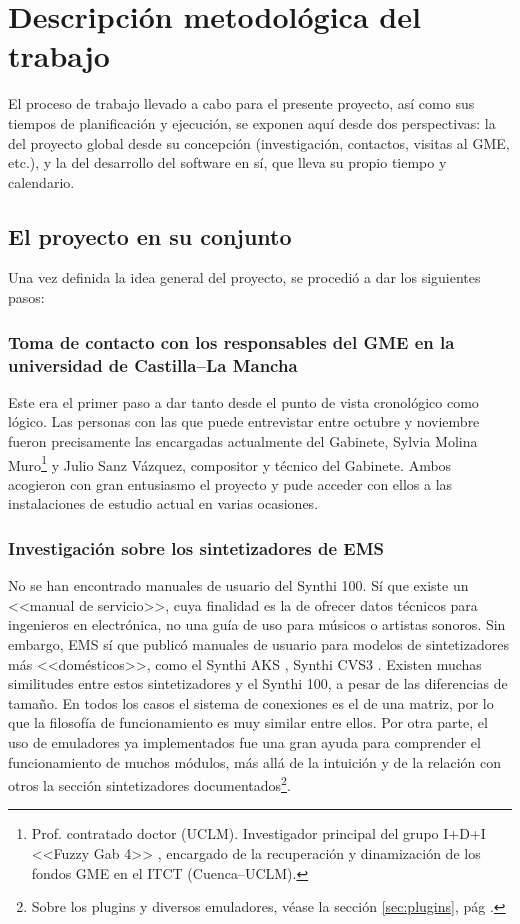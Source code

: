 \chapter[Metodología]{Descripción metodológica del trabajo}

El proceso de trabajo llevado a cabo para el presente proyecto, así como sus tiempos de planificación y ejecución, se exponen aquí desde dos perspectivas: la del proyecto global desde su concepción (investigación, contactos, visitas al GME, etc.), y la del desarrollo del software en sí, que lleva su propio tiempo y calendario. 

\section[El proyecto en su conjunto]{El proyecto en su conjunto }


Una vez definida la idea general del proyecto, se procedió a dar los siguientes pasos:

\subsection{Toma de contacto con los responsables del GME en la universidad de Castilla--La Mancha }

Este era el primer paso a dar tanto desde el punto de vista cronológico como lógico. Las personas con las que puede entrevistar entre octubre y noviembre fueron precisamente las encargadas actualmente del Gabinete, Sylvia Molina Muro\footnote{Prof. contratado doctor (UCLM). Investigador principal del grupo I+D+I <<Fuzzy Gab 4>> \citeyear{fuzzy}, encargado de la recuperación y dinamización de los fondos GME en el ITCT (Cuenca--UCLM).} y Julio Sanz Vázquez, compositor y técnico del Gabinete. Ambos acogieron con gran entusiasmo el proyecto y pude acceder con ellos a las instalaciones de estudio actual en varias ocasiones.

\subsection{Investigación sobre los sintetizadores de EMS}

No se han encontrado manuales de usuario del Synthi 100. Sí que existe un <<manual de servicio>>, cuya finalidad es la de ofrecer datos técnicos para ingenieros en electrónica, no una guía de uso para músicos o artistas sonoros. Sin embargo, EMS sí que publicó manuales de usuario para modelos de sintetizadores más <<domésticos>>, como el Synthi AKS \citeyear{SynthiAKS_brochure}, Synthi CVS3 \citeyear{SynthiVCS3_brochure}. Existen muchas similitudes entre estos sintetizadores y el Synthi 100, a pesar de las diferencias de tamaño. En todos los casos el sistema de conexiones es el de una matriz, por lo que la filosofía de funcionamiento es muy similar entre ellos. Por otra parte, el uso de emuladores ya implementados fue una gran ayuda para comprender el funcionamiento de muchos módulos, más allá de la intuición y de la relación con otros la sección sintetizadores documentados\footnote{Sobre los plugins y diversos emuladores, véase la sección \ref*{sec:plugins}, pág \pageref{sec:plugins}.}.


